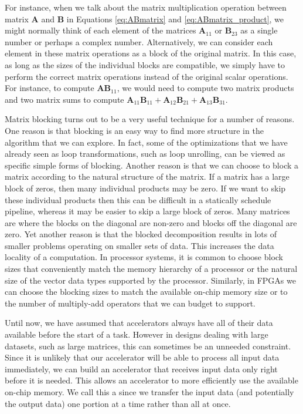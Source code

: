 For instance, when we talk about the matrix multiplication operation between matrix $\mathbf{A}$ and $\mathbf{B}$ in Equations \ref{eq:ABmatrix} and \ref{eq:ABmatrix_product}, we might normally think of each element of the matrices $\mathbf{A}_{11}$ or $\mathbf{B}_{23}$ as a single number or perhaps a complex number.  Alternatively, we can consider each element in these matrix operations as a block of the original matrix.  In this case, as long as the sizes of the individual blocks are compatible, we simply have to perform the correct matrix operations instead of the original scalar operations.  For instance, to compute $\mathbf{AB}_{11}$, we would need to compute two matrix products and two matrix sums to compute $\mathbf{A}_{11}\mathbf{B}_{11} + \mathbf{A}_{12}\mathbf{B}_{21} + \mathbf{A}_{13}\mathbf{B}_{31}$.

Matrix blocking turns out to be a very useful technique for a number of reasons.  One reason is that blocking is an easy way to find more structure in the algorithm that we can explore.  In fact, some of the optimizations that we have already seen as loop transformations, such as loop unrolling, can be viewed as specific simple forms of blocking.  Another reason is that we can choose to block a matrix according to the natural structure of the matrix.  If a matrix has a large block of zeros, then many individual products may be zero.  If we want to skip these individual products then this can be difficult in a statically schedule pipeline, whereas it may be easier to skip a large block of zeros.  Many matrices are  where the blocks on the diagonal are non-zero and blocks off the diagonal are zero.  Yet another reason is that the blocked decomposition results in lots of smaller problems operating on smaller sets of data.  This increases the data locality of a computation.  In processor systems, it is common to choose block sizes that conveniently match the memory hierarchy of a processor or the natural size of the vector data types supported by the processor.  Similarly, in FPGAs we can choose the blocking sizes to match the available on-chip memory size or to the number of multiply-add operators that we can budget to support.

Until now, we have assumed that accelerators always have all of their data available before the start of a task.  However in designs dealing with large datasets, such as large matrices, this can sometimes be an unneeded constraint.  Since it is unlikely that our accelerator will be able to process all input data immediately, we can build an accelerator that receives input data only right before it is needed.  This allows an accelerator to more efficiently use the available on-chip memory.  We call this a  since we transfer the input data (and potentially the output data) one portion at a time rather than all at once.

